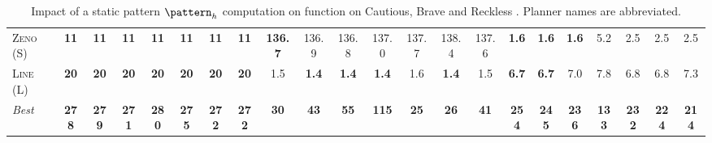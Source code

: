 \documentclass[11pt,landscape]{article}
\begin{document}
\begin{table}[tb]
{\begin{tabular}{|l||ccccccc||ccccccc||ccccccc||}
\textsc{Zeno} (S)&\textbf{11}&\textbf{11}&\textbf{11}&\textbf{11}&\textbf{11}&\textbf{11}&\textbf{11}&\textbf{136.7}&136.9&136.8&137.0&137.7&138.4&137.6&\textbf{1.6}&\textbf{1.6}&\textbf{1.6}&5.2&2.5&2.5&2.5\\
\textsc{Line} (L)&\textbf{20}&\textbf{20}&\textbf{20}&\textbf{20}&\textbf{20}&\textbf{20}&\textbf{20}&1.5&\textbf{1.4}&\textbf{1.4}&\textbf{1.4}&1.6&\textbf{1.4}&1.5&\textbf{6.7}&\textbf{6.7}&7.0&7.8&6.8&6.8&7.3
\\\hline
\textit{Best}&\textbf{278}&\textbf{279}&\textbf{271}&\textbf{280}&\textbf{275}&\textbf{272}&\textbf{272}&\textbf{30}&\textbf{43}&\textbf{55}&\textbf{115}&\textbf{25}&\textbf{26}&\textbf{41}&\textbf{254}&\textbf{245}&\textbf{236}&\textbf{133}&\textbf{232}&\textbf{224}&\textbf{214}\\\hline

        \end{tabular}}
        \caption{Impact of a static pattern $\pattern_h$ computation on function on Cautious, Brave and Reckless \pattyd. Planner names are abbreviated.}
        \label{tab:abl-patternh-static}
        \end{table}
        
\end{document}
